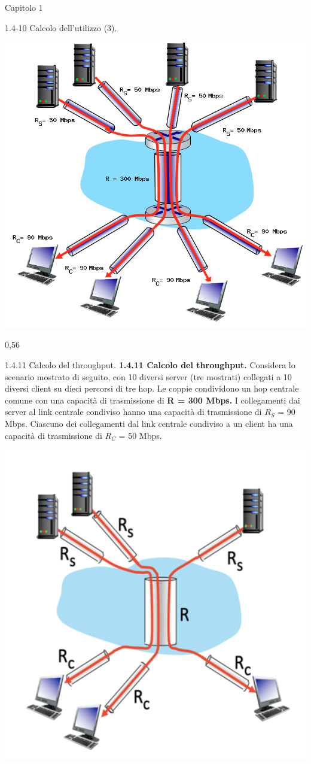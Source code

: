 \documentclass[a4paper]{article}
\begin{document}
\begin{quiz}{Capitolo 1}
\begin{shortanswer}[points=1,shuffle=true]{1.4-10 Calcolo dell'utilizzo (3).}
\begin{center}
\includegraphics[width=0.7\linewidth]{figs/1.4.7.png}
\end{center}
\item 0,56
\end{shortanswer}

\begin{multi}[points=1,shuffle=true]{1.4.11 Calcolo del throughput.}
\textbf{1.4.11 Calcolo del throughput.} 
Considera lo scenario mostrato di seguito, con 10 diversi server (tre mostrati) collegati a 10 diversi client su dieci percorsi di tre hop. Le coppie condividono un hop centrale comune con una capacità di trasmissione di \textbf{R = 300 Mbps.} I collegamenti dai server al link centrale condiviso hanno una capacità di trasmissione di $R_S$ = 90 Mbps. Ciascuno dei collegamenti dal link centrale condiviso a un client ha una capacità di trasmissione di $R_C$ = 50 Mbps.
\begin{center}
\includegraphics[width=0.7\linewidth]{figs/1.4.11.png}
\end{center}


\end{multi}
\end{quiz}
\end{document}
